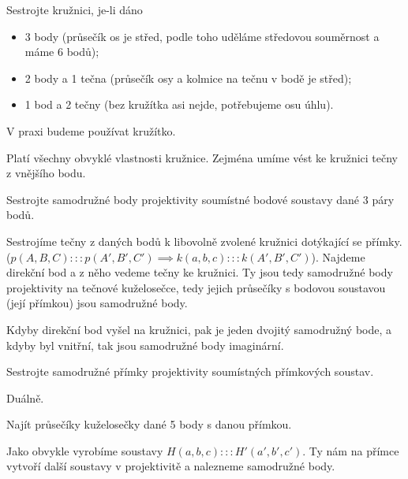 \documentclass[12pt]{article}					%
\begin{document}
\begin{priklad}
	Sestrojte kružnici, je-li dáno
	\begin{itemize}
		\item 3 body (průsečík os je střed, podle toho uděláme středovou souměrnost a máme 6 bodů);
		\item 2 body a 1 tečna (průsečík osy a kolmice na tečnu v bodě je střed);
		\item 1 bod a 2 tečny (bez kružítka asi nejde, potřebujeme osu úhlu).
	\end{itemize}
\end{priklad}

\begin{poznamka}
	V praxi budeme používat kružítko.

	Platí všechny obvyklé vlastnosti kružnice. Zejména umíme vést ke kružnici tečny z vnějšího bodu.
\end{poznamka}

\begin{priklad}
	Sestrojte samodružné body projektivity soumístné bodové soustavy dané 3 páry bodů.

	\begin{reseni}
		Sestrojíme tečny z daných bodů k libovolně zvolené kružnici dotýkající se přímky. ($p(A, B, C):::p(A', B', C') \implies k(a, b, c):::k(A', B', C')$). Najdeme direkční bod a z něho vedeme tečny ke kružnici. Ty jsou tedy samodružné body projektivity na tečnové kuželosečce, tedy jejich průsečíky s bodovou soustavou (její přímkou) jsou samodružné body.
	\end{reseni}

	\begin{poznamkain}
		Kdyby direkční bod vyšel na kružnici, pak je jeden dvojitý samodružný bode, a kdyby byl vnitřní, tak jsou samodružné body imaginární.
	\end{poznamkain}
\end{priklad}

\begin{priklad}
	Sestrojte samodružné přímky projektivity soumístných přímkových soustav.

	\begin{reseni}
		Duálně.
	\end{reseni}
\end{priklad}

\begin{priklad}
	Najít průsečíky kuželosečky dané 5 body s danou přímkou.

	\begin{reseni}
		Jako obvykle vyrobíme soustavy $H(a, b, c):::H'(a', b', c')$. Ty nám na přímce vytvoří další soustavy v projektivitě a nalezneme samodružné body.
	\end{reseni}
\end{priklad}
\end{document}
